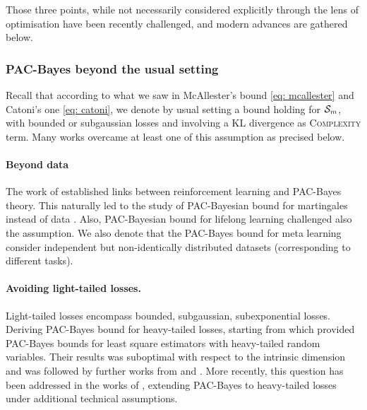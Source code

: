 Those three points, while not necessarily considered explicitly through the lens of optimisation have been recently challenged, and modern advances are gathered below. 



\subsubsection*{PAC-Bayes beyond the usual setting}

Recall that according to what we saw in McAllester's bound \eqref{eq: mcallester} and Catoni's one \eqref{eq: catoni}, we denote by usual setting a bound holding for \iid $\mathcal{S}_m$, with bounded or subgaussian losses and involving a KL divergence as \textsc{Complexity} term. Many works overcame at least one of this assumption as precised below. 

\paragraph{Beyond \iid data} The work of \citet{fard2010pac} established links between reinforcement learning and PAC-Bayes theory. This naturally led to the study of PAC-Bayesian bound for martingales instead of \iid data \citep{seldin2011pac,seldin2012bandit,seldin2012pac}. Also, PAC-Bayesian bound for lifelong learning \citep{pentina2014pac,flynn2022pac} challenged also the \iid assumption. We also denote that the PAC-Bayes bound for meta learning \citep{amit2018meta,farid2021generalization,rothfuss2021pacoh,rothfuss2022pac,ding2021bridging} consider independent but non-identically distributed datasets (corresponding to different tasks).

\paragraph{Avoiding light-tailed losses.} Light-tailed losses encompass bounded, subgaussian, subexponential losses. Deriving PAC-Bayes bound for heavy-tailed losses, starting from \citet{audibert2011robust} which provided PAC-Bayes bounds for least square estimators with heavy-tailed random variables. Their results was suboptimal with respect to the intrinsic dimension and was followed by further works from \citet{catoni2016pac} and \citet{catoni2017dimension}.
More recently, this question has been addressed in the works of \citet{alquier2018simpler, holland2019pac,kuzborskij2019efron,haddouche2021pac}, extending PAC-Bayes to heavy-tailed losses under additional technical assumptions.

